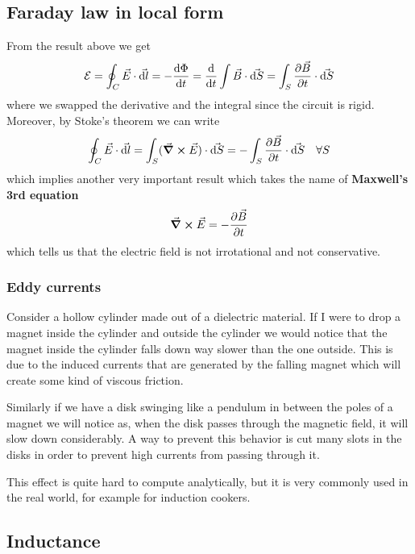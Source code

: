 \documentclass[12pt]{extarticle}
\begin{document}
\subsection{Faraday law in local form}

From the result above we get
\begin{equation}
	\mathcal{E} = \oint_C \vec E \cdot \vec{\dd l } = - \dv{\Phi}{t} = \dv{t} \int \vec B \cdot \vec{\dd S} = \int_S \pdv{\vec B}{t} \cdot \vec{\dd S}
\end{equation}
where we swapped the derivative and the integral since the circuit is rigid.
Moreover, by Stoke's theorem we can write
\begin{equation}
	\oint_C \vec E \cdot \vec{\dd l} = \int_S (\curl \vec E) \cdot \vec {\dd{S}} = - \int_S\pdv{\vec B}{t} \cdot \vec{\dd S} \quad \forall S
\end{equation}
which implies another very important result which takes the name of \textbf{Maxwell's 3rd equation}
\begin{equation}
	\curl \vec E = - \pdv{\vec B}{t}
\end{equation}
which tells us that the electric field is not irrotational and not conservative.

\subsubsection{Eddy currents}

Consider a hollow cylinder made out of a dielectric material.
If I were to drop a magnet inside the cylinder and outside the cylinder we would notice that
the magnet inside the cylinder falls down way slower than the one outside.
This is due to the induced currents that are generated by the falling magnet which will create some kind of viscous friction.

Similarly if we have a disk swinging like a pendulum in between the poles of a magnet
we will notice as, when the disk passes through the magnetic field, it will slow down considerably.
A way to prevent this behavior is cut many slots in the disks in order to prevent high currents from passing through it.

This effect is quite hard to compute analytically, but it is very commonly used in the real world,
for example for induction cookers.

\subsection{Inductance}
\end{document}
